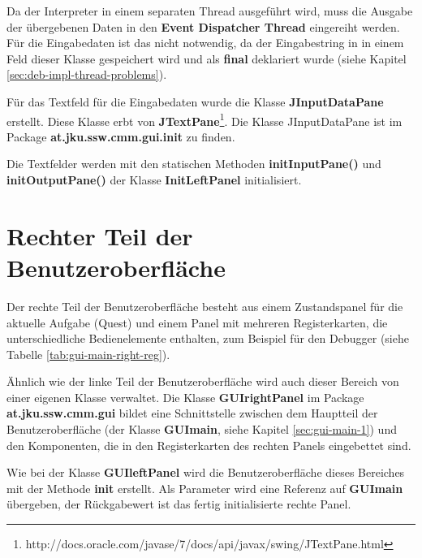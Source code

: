 Da der Interpreter in einem separaten Thread ausgeführt wird, muss die Ausgabe der übergebenen Daten in den \textbf{Event Dispatcher Thread} eingereiht werden. Für die Eingabedaten ist das nicht notwendig, da der Eingabestring in in einem Feld dieser Klasse gespeichert wird und als \textbf{final} deklariert wurde (siehe Kapitel \ref{sec:deb-impl-thread-problems}).

Für das Textfeld für die Eingabedaten wurde die Klasse \textbf{JInputDataPane} erstellt. Diese Klasse erbt von \textbf{JTextPane}\footnote{http://docs.oracle.com/javase/7/docs/api/javax/swing/JTextPane.html}. Die Klasse JInputDataPane ist im Package \textbf{at.jku.ssw.cmm.gui.init} zu finden. 

Die Textfelder werden mit den statischen Methoden \textbf{initInputPane()} und \textbf{initOutputPane()} der Klasse \textbf{InitLeftPanel} initialisiert.

\section{Rechter Teil der Benutzeroberfläche}
Der rechte Teil der Benutzeroberfläche besteht aus einem Zustandspanel für die aktuelle Aufgabe (Quest) und einem Panel mit mehreren Registerkarten, die unterschiedliche Bedienelemente enthalten, zum Beispiel für den Debugger (siehe Tabelle \ref{tab:gui-main-right-reg}).

Ähnlich wie der linke Teil der Benutzeroberfläche wird auch dieser Bereich von einer eigenen Klasse verwaltet. Die Klasse \textbf{GUIrightPanel} im Package \textbf{at.jku.ssw.cmm.gui} bildet eine Schnittstelle zwischen dem Hauptteil der Benutzeroberfläche (der Klasse \textbf{GUImain}, siehe Kapitel \ref{sec:gui-main-1}) und den Komponenten, die in den Registerkarten des rechten Panels eingebettet sind.

Wie bei der Klasse \textbf{GUIleftPanel} wird die Benutzeroberfläche dieses Bereiches mit der Methode \textbf{init} erstellt. Als Parameter wird eine Referenz auf \textbf{GUImain} übergeben, der Rückgabewert ist das fertig initialisierte rechte Panel.

